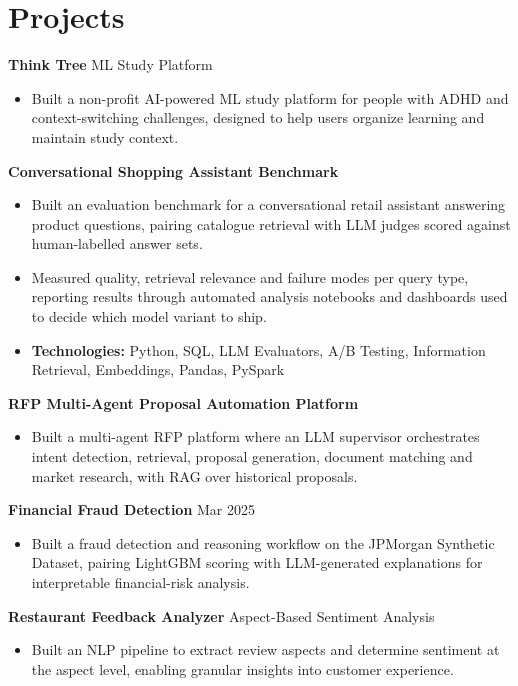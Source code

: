\documentclass[10pt,a4paper]{article}
\begin{document}
\section{Projects}
\textbf{Think Tree} \textbar{} ML Study Platform\par
\begin{itemize}
  \item Built a non-profit AI-powered ML study platform for people with ADHD and context-switching challenges, designed to help users organize learning and maintain study context.
\end{itemize}
\textbf{Conversational Shopping Assistant Benchmark}\par
\begin{itemize}
  \item Built an evaluation benchmark for a conversational retail assistant answering product questions, pairing catalogue retrieval with LLM judges scored against human-labelled answer sets.
  \item Measured quality, retrieval relevance and failure modes per query type, reporting results through automated analysis notebooks and dashboards used to decide which model variant to ship.
  \item \textbf{Technologies:} Python, SQL, LLM Evaluators, A/B Testing, Information Retrieval, Embeddings, Pandas, PySpark
\end{itemize}
\textbf{RFP Multi-Agent Proposal Automation Platform}\par
\begin{itemize}
  \item Built a multi-agent RFP platform where an LLM supervisor orchestrates intent detection, retrieval, proposal generation, document matching and market research, with RAG over historical proposals.
\end{itemize}
\textbf{Financial Fraud Detection} \textbar{} Mar 2025\par
\begin{itemize}
  \item Built a fraud detection and reasoning workflow on the JPMorgan Synthetic Dataset, pairing LightGBM scoring with LLM-generated explanations for interpretable financial-risk analysis.
\end{itemize}
\textbf{Restaurant Feedback Analyzer} \textbar{} Aspect-Based Sentiment Analysis\par
\begin{itemize}
  \item Built an NLP pipeline to extract review aspects and determine sentiment at the aspect level, enabling granular insights into customer experience.
\end{itemize}
\end{document}
